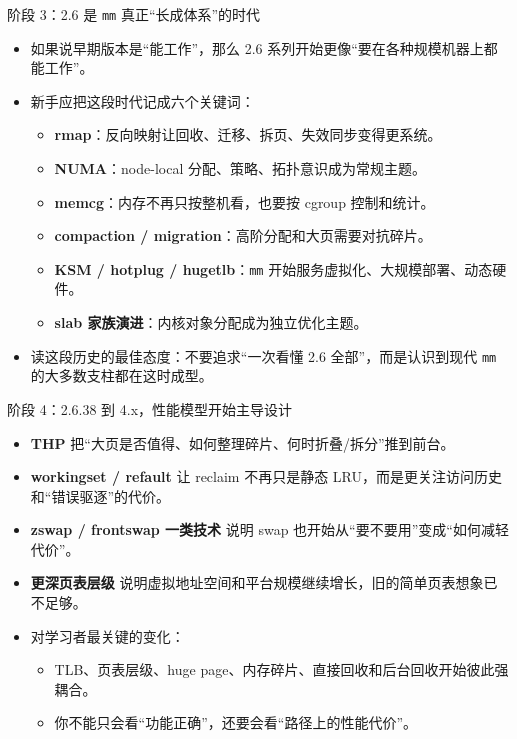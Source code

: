 \documentclass[UTF8,aspectratio=169]{ctexbeamer}
\begin{document}
\begin{frame}[t]{阶段 3：2.6 是 \texttt{mm} 真正“长成体系”的时代}
\small
\begin{itemize}
  \item 如果说早期版本是“能工作”，那么 2.6 系列开始更像“要在各种规模机器上都能工作”。
  \item 新手应把这段时代记成六个关键词：
  \begin{itemize}
    \item \textbf{rmap}：反向映射让回收、迁移、拆页、失效同步变得更系统。
    \item \textbf{NUMA}：node-local 分配、策略、拓扑意识成为常规主题。
    \item \textbf{memcg}：内存不再只按整机看，也要按 cgroup 控制和统计。
    \item \textbf{compaction / migration}：高阶分配和大页需要对抗碎片。
    \item \textbf{KSM / hotplug / hugetlb}：\texttt{mm} 开始服务虚拟化、大规模部署、动态硬件。
    \item \textbf{slab 家族演进}：内核对象分配成为独立优化主题。
  \end{itemize}
  \item 读这段历史的最佳态度：不要追求“一次看懂 2.6 全部”，而是认识到现代 \texttt{mm} 的大多数支柱都在这时成型。
\end{itemize}
\end{frame}

\begin{frame}[t]{阶段 4：2.6.38 到 4.x，性能模型开始主导设计}
\small
\begin{itemize}
  \item \textbf{THP} 把“大页是否值得、如何整理碎片、何时折叠/拆分”推到前台。
  \item \textbf{workingset / refault} 让 reclaim 不再只是静态 LRU，而是更关注访问历史和“错误驱逐”的代价。
  \item \textbf{zswap / frontswap 一类技术} 说明 swap 也开始从“要不要用”变成“如何减轻代价”。
  \item \textbf{更深页表层级} 说明虚拟地址空间和平台规模继续增长，旧的简单页表想象已不足够。
  \item 对学习者最关键的变化：
  \begin{itemize}
    \item TLB、页表层级、huge page、内存碎片、直接回收和后台回收开始彼此强耦合。
    \item 你不能只会看“功能正确”，还要会看“路径上的性能代价”。
  \end{itemize}
\end{itemize}
\end{frame}
\end{document}
